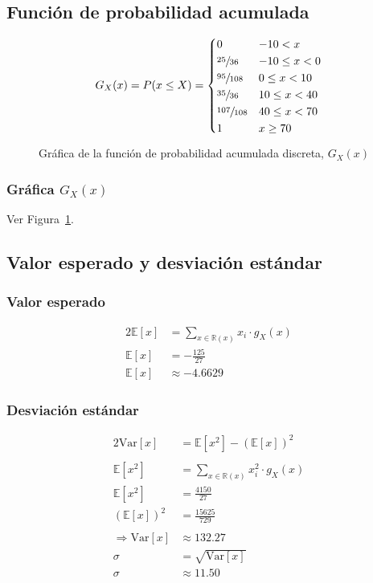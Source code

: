 \documentclass[paper=letterpaper]{article}
\begin{document}
\subsection{Función de probabilidad acumulada}
\begin{equation*}
G_{X}(x) = P(x \leq X) = 
\begin{dcases}
     0 & -10 < x \\
     \sfrac{25}{36} & -10 \leq x < 0 \\
     \sfrac{95}{108} & 0 \leq x < 10 \\
     \sfrac{35}{36} & 10 \leq x < 40  \\
     \sfrac{107}{108} & 40 \leq x < 70 \\
     1 & x \geq 70 
   \end{dcases}
\end{equation*}
\begin{figure}[!htbp]
\centering
{}
\caption{Gráfica de la función de probabilidad acumulada discreta, $G_X(x)$}
\label{Fig:F5}
\end{figure}

\subsubsection{Gráfica $G_X(x)$}
Ver Figura~\ref{Fig:F5}.

\subsection{Valor esperado y desviaci\'{o}n est\'{a}ndar}
\subsubsection{Valor esperado}
\begin{alignat}{2}
\mathbb{E}[x] &= \sum_{x \in \mathbb{R}(x)} x_i \cdot g_X(x) \\
\mathbb{E}[x] &= -\frac{125}{27} \\
\mathbb{E}[x] &\approx -4.6629 \label{eq:e4}
\end{alignat}
\subsubsection{Desviaci\'{o}n est\'{a}ndar}
\begin{alignat}{2}
\text{Var}[x] &= \mathbb{E}[x^2] - (\mathbb{E}[x])^2 \\ \\
\mathbb{E}[x^2] &= \sum_{x \in \mathbb{R}(x)} x_i^2 \cdot g_X(x) \\
\mathbb{E}[x^2] &= \frac{4150}{27} \\
(\mathbb{E}[x])^2 &= \frac{15625}{729} \\ \\
\Rightarrow \text{Var}[x] &\approx 132.27 \\
\sigma &= \sqrt{\text{Var}[x]} \\
\sigma &\approx 11.50 \label{eq:e5}
\end{alignat}
\end{document}
